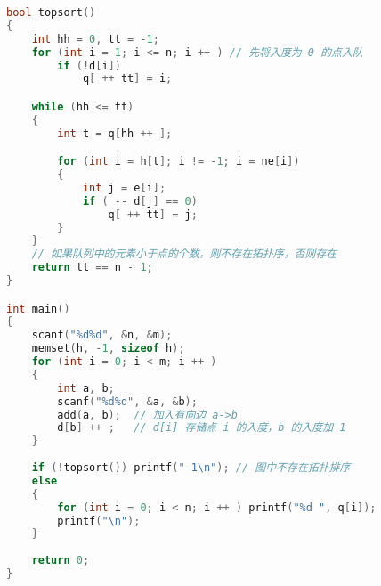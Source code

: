 \begin{lstlisting}[language=cpp]
bool topsort()
{
    int hh = 0, tt = -1;
    for (int i = 1; i <= n; i ++ ) // 先将入度为 0 的点入队
        if (!d[i])
            q[ ++ tt] = i;

    while (hh <= tt)
    {
        int t = q[hh ++ ];

        for (int i = h[t]; i != -1; i = ne[i])
        {
            int j = e[i];
            if ( -- d[j] == 0)
                q[ ++ tt] = j;
        }
    }
    // 如果队列中的元素小于点的个数，则不存在拓扑序，否则存在
    return tt == n - 1;
}

int main()
{
    scanf("%d%d", &n, &m);
    memset(h, -1, sizeof h);
    for (int i = 0; i < m; i ++ )
    {
        int a, b;
        scanf("%d%d", &a, &b);
        add(a, b);  // 加入有向边 a->b
        d[b] ++ ;   // d[i] 存储点 i 的入度，b 的入度加 1
    }
    
    if (!topsort()) printf("-1\n"); // 图中不存在拓扑排序
    else
    {
        for (int i = 0; i < n; i ++ ) printf("%d ", q[i]);
        printf("\n");
    }
    
    return 0;
}
\end{lstlisting}